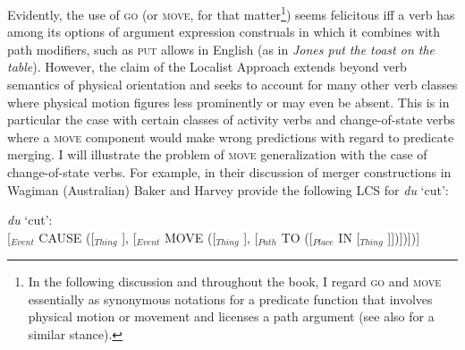 Evidently, the use of \textsc{go} (or \textsc{move}, for that matter\footnote{In the following discussion and throughout the book, I regard \textsc{go} and \textsc{move} essentially as synonymous notations for a predicate function that involves physical motion or movement and licenses a path argument (see also \citealt[27]{baker2010complex} for a similar stance).}) seems felicitous iff a verb has among its options of argument expression construals in which it combines with path modifiers, such as \textsc{put} allows in English (as in \textit{Jones put the toast on the table}). However, the claim of the Localist Approach extends beyond verb semantics of physical orientation and seeks to account for many other verb classes where physical motion figures less prominently or may even be absent. This is in particular the case with certain classes of activity verbs and change-of-state verbs where a \textsc{move} component would make wrong predictions with regard to predicate merging. I will illustrate the problem of \textsc{move} generalization with the case of change-of-state verbs. For example, in their discussion of merger constructions in Wagiman (Australian) Baker and Harvey provide the following LCS for \textit{du} `cut':

\ea \label{Wagiman01}
\textit{du} `cut': \\
{\small[$_{Event}$ CAUSE ([$_{Thing}$ ], [$_{Event}$ MOVE ([$_{Thing}$ ], 
[$_{Path}$ TO ([$_{Place}$ IN [$_{Thing}$ ]])])])]}
\z

